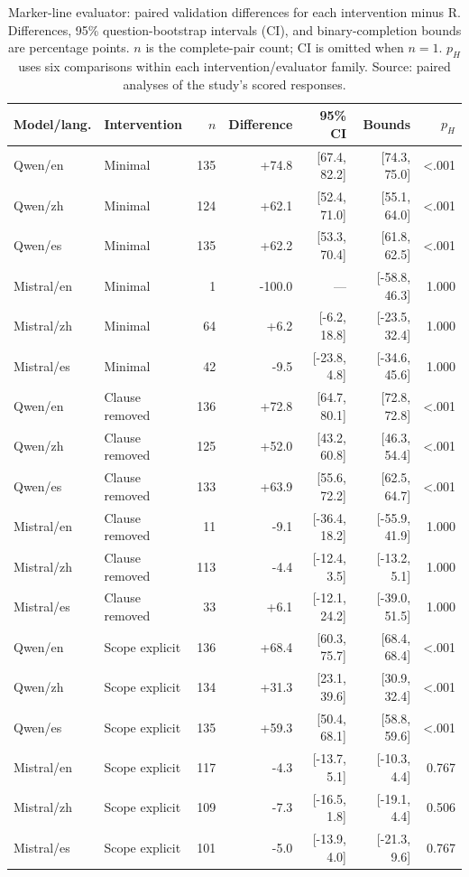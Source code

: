 \begin{table}[!htbp]\centering\small
\caption{Marker-line evaluator: paired validation differences for each intervention minus R. Differences, 95\% question-bootstrap intervals (CI), and binary-completion bounds are percentage points. $n$ is the complete-pair count; CI is omitted when $n=1$. $p_H$ uses six comparisons within each intervention/evaluator family. Source: paired analyses of the study's scored responses.}
\label{tab:validation_marker_line}
\begin{tabular}{@{}llrrrrr@{}}\toprule
Model/lang. & Intervention & $n$ & Difference & 95\% CI & Bounds & $p_H$ \\\midrule
Qwen/en & Minimal & 135 & +74.8 & [67.4, 82.2] & [74.3, 75.0] & <.001 \\
Qwen/zh & Minimal & 124 & +62.1 & [52.4, 71.0] & [55.1, 64.0] & <.001 \\
Qwen/es & Minimal & 135 & +62.2 & [53.3, 70.4] & [61.8, 62.5] & <.001 \\
Mistral/en & Minimal & 1 & -100.0 & --- & [-58.8, 46.3] & 1.000 \\
Mistral/zh & Minimal & 64 & +6.2 & [-6.2, 18.8] & [-23.5, 32.4] & 1.000 \\
Mistral/es & Minimal & 42 & -9.5 & [-23.8, 4.8] & [-34.6, 45.6] & 1.000 \\
Qwen/en & Clause removed & 136 & +72.8 & [64.7, 80.1] & [72.8, 72.8] & <.001 \\
Qwen/zh & Clause removed & 125 & +52.0 & [43.2, 60.8] & [46.3, 54.4] & <.001 \\
Qwen/es & Clause removed & 133 & +63.9 & [55.6, 72.2] & [62.5, 64.7] & <.001 \\
Mistral/en & Clause removed & 11 & -9.1 & [-36.4, 18.2] & [-55.9, 41.9] & 1.000 \\
Mistral/zh & Clause removed & 113 & -4.4 & [-12.4, 3.5] & [-13.2, 5.1] & 1.000 \\
Mistral/es & Clause removed & 33 & +6.1 & [-12.1, 24.2] & [-39.0, 51.5] & 1.000 \\
Qwen/en & Scope explicit & 136 & +68.4 & [60.3, 75.7] & [68.4, 68.4] & <.001 \\
Qwen/zh & Scope explicit & 134 & +31.3 & [23.1, 39.6] & [30.9, 32.4] & <.001 \\
Qwen/es & Scope explicit & 135 & +59.3 & [50.4, 68.1] & [58.8, 59.6] & <.001 \\
Mistral/en & Scope explicit & 117 & -4.3 & [-13.7, 5.1] & [-10.3, 4.4] & 0.767 \\
Mistral/zh & Scope explicit & 109 & -7.3 & [-16.5, 1.8] & [-19.1, 4.4] & 0.506 \\
Mistral/es & Scope explicit & 101 & -5.0 & [-13.9, 4.0] & [-21.3, 9.6] & 0.767 \\
\bottomrule\end{tabular}\end{table}
